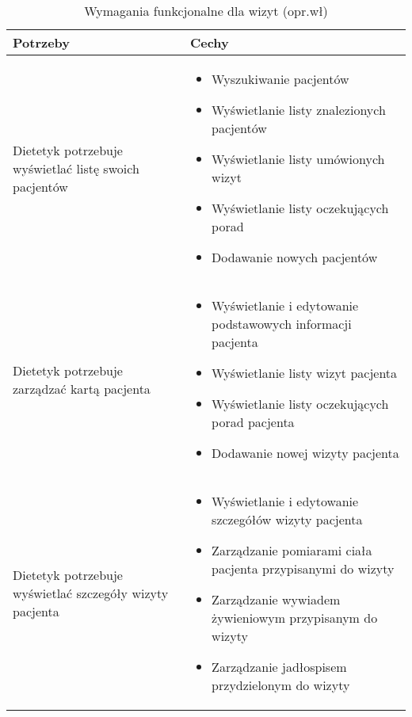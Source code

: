 \begin{minipage}{\textwidth}
    \begin{table}[H]
        \centering\caption{Wymagania funkcjonalne dla wizyt (opr.wł)\label{tabela:wymaganiaFunkcjonalneWizyty}}
        \begin{tabular}{|P{.3\textwidth}|P{.6\textwidth}|}
            \hline
            Potrzeby & Cechy \\

            \hline
            Dietetyk potrzebuje wyświetlać listę swoich pacjentów &
            \begin{itemize}
                \item Wyszukiwanie pacjentów
                \item Wyświetlanie listy znalezionych pacjentów
                \item Wyświetlanie listy umówionych wizyt
                \item Wyświetlanie listy oczekujących porad
                \item Dodawanie nowych pacjentów
            \end{itemize} \\
            \hline
            Dietetyk potrzebuje zarządzać kartą pacjenta &
            \begin{itemize}
                \item Wyświetlanie i edytowanie podstawowych informacji pacjenta
                \item Wyświetlanie listy wizyt pacjenta
                \item Wyświetlanie listy oczekujących porad pacjenta
                \item Dodawanie nowej wizyty pacjenta
            \end{itemize} \\
            \hline
            Dietetyk potrzebuje wyświetlać szczegóły wizyty pacjenta &
            \begin{itemize}
                \item Wyświetlanie i edytowanie szczegółów wizyty pacjenta
                \item Zarządzanie pomiarami ciała pacjenta przypisanymi do wizyty
                \item Zarządzanie wywiadem żywieniowym przypisanym do wizyty
                \item Zarządzanie jadłospisem przydzielonym do wizyty
            \end{itemize} \\

\end{tabular}
\end{table}
\end{minipage}
